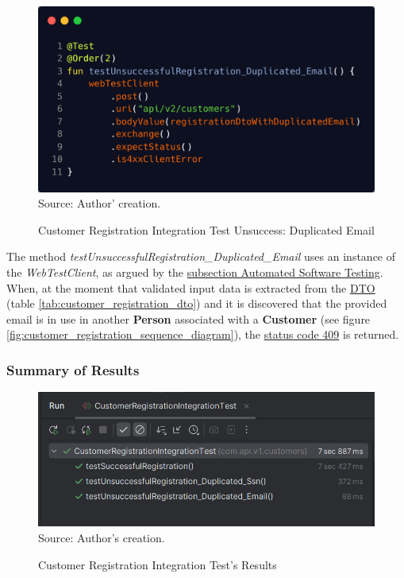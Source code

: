 \begin{figure}[H]
	\centering
	\caption{Customer Registration Integration Test Unsuccess: Duplicated Email}
	\includegraphics[width=1\linewidth]{figures/customer_registration_integration_test_unsuccess_duplicated_email.png}
	\label{fig:customer_registration_integration_test_unsuccess_duplicated_email} 
	\\ \footnotesize Source: Author' creation.
\end{figure}

The method \textit{testUnsuccessfulRegistration\_Duplicated\_Email} uses an instance of the \textit{WebTestClient}, as argued by the \hyperref[subsection:automated_software_testing]{subsection Automated Software Testing}. When, at the moment that validated input data is extracted from the \hyperref[appendix:glossary]{DTO} (table \ref{tab:customer_registration_dto}) and it is discovered that the provided email is in use in another \textbf{Person} associated with a \textbf{Customer} (see figure \ref{fig:customer_registration_sequence_diagram}), the \hyperref[tab:summary_http_status_codes]{status code 409} is returned.

\subsubsection{Summary of Results}

\begin{figure}[H]
	\centering
	\caption{Customer Registration Integration Test's Results}
	\includegraphics[width=1\linewidth]{figures/results_customer_registration_integration_test.PNG}
	\\ \footnotesize Source: Author's creation.
	\label{fig:results_customer_registration_integration_test}
\end{figure}

